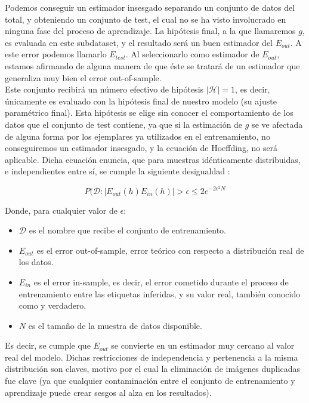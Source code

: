 Podemos conseguir un estimador insesgado separando un conjunto de datos del total, y obteniendo un conjunto de test, el cual no se ha visto involucrado en ninguna fase del proceso de aprendizaje. La hipótesis final, a la que llamaremos $g$, es evaluada en este subdataset, y el resultado será un buen estimador del $E_{out}$. A este error podemos llamarlo $E_{test}$. Al seleccionarlo como estimador de $E_{out}$, estamos afirmando de alguna manera de que éste se tratará de un estimador que generaliza muy bien el error out-of-sample.\\

Este conjunto recibirá un número efectivo de hipótesis $|\mathcal H|= 1$, es decir, únicamente es evaluado con la hipótesis final de nuestro modelo (su ajuste paramétrico final). Esta hipótesis se elige sin conocer el comportamiento de los datos que el conjunto de test contiene, ya que si la estimación de $g$ se ve afectada de alguna forma por los ejemplares ya utilizados en el entrenamiento, no conseguiremos un estimador insesgado, y la ecuación de Hoeffding, no será aplicable. Dicha ecuación enuncia, que para muestras idénticamente distribuidas, e independientes entre sí, se cumple la siguiente desigualdad \cite{Mostafa2012}:

$$P(\mathcal{D}: | E_{out}(h) E_{in}(h) |  > \epsilon \leq 2e^{-2\epsilon^2	N}$$

Donde, para cualquier valor de $\epsilon$:
\begin{itemize}
	\item $\mathcal{D}$ es el nombre que recibe el conjunto de entrenamiento.
	\item $ E_{out}$ es el error out-of-sample, error teórico con respecto a distribución real de los datos.
	\item  $E_{in}$ es el error in-sample, es decir, el error cometido durante el proceso de entrenamiento entre las etiquetas inferidas, y su valor real, también conocido como y verdadero.
	\item $N$ es el tamaño de la muestra de datos disponible.
\end{itemize}

Es decir, se cumple que $E_{out}$ se convierte en un estimador muy cercano al valor real del modelo. Dichas restricciones de independencia y pertenencia a la misma distribución son claves,
 motivo por el cual la eliminación de imágenes duplicadas fue clave (ya que cualquier contaminación entre el conjunto de entrenamiento y aprendizaje puede crear sesgos al alza en los resultados). \\

